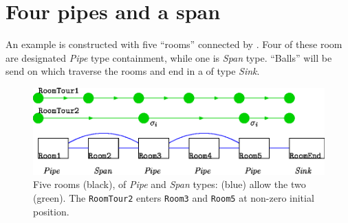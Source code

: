 
\section{Four pipes and a span}
\label{Sec:fourpipes}

An example is constructed with five ``rooms'' connected by .
Four of these room  are designated \emph{Pipe} type containment,
while one is \emph{Span} type. ``Balls'' will be send on  which
traverse the rooms and end in a  of type \emph{Sink}.

\begin{figure}[ht]
  \centering
  \includegraphics[angle=0,width=12cm]{50_figs/_FiveRooms.eps}
  \caption{Five rooms (black), of \emph{Pipe} and \emph{Span} types:  (blue) allow the two  (green).
    The {\tt RoomTour2}  enters {\tt Room3} and {\tt Room5} at non-zero initial position.}
  \label{fiverooms}
\end{figure}


